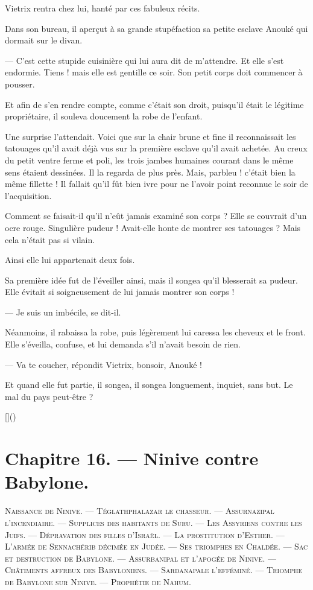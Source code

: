 \documentclass[a4paper, 11pt, oneside, polutonikogreek, french]{article}
\begin{document}
\bigskip
\centerline{\EightStarTaper}
\centerline{\EightStarTaper\EightStarTaper}
\bigskip

Vietrix rentra chez lui, hanté par ces fabuleux récits.

Dans son bureau, il aperçut à sa grande stupéfaction sa petite esclave Anouké qui dormait sur le divan.

--- C'est cette stupide cuisinière qui lui aura dit de m'attendre. Et elle s'est endormie. Tiens ! mais elle est gentille ce soir. Son petit corps doit commencer à pousser.

Et afin de s'en rendre compte, comme c'était son droit, puisqu'il était le légitime propriétaire, il souleva doucement la robe de l'enfant.

Une surprise l'attendait. Voici que sur la chair brune et fine il reconnaissait les tatouages qu'il avait déjà vus sur la première esclave qu'il avait achetée. Au creux du petit ventre ferme et poli, les trois jambes humaines courant dans le même sens étaient dessinées. Il la regarda de plus près. Mais, parbleu ! c'était bien la même fillette ! Il fallait qu'il fût bien ivre pour ne l'avoir point reconnue le soir de l'acquisition.

Comment se faisait-il qu'il n'eût jamais examiné son corps ? Elle se couvrait d'un ocre rouge. Singulière pudeur ! Avait-elle honte de montrer ses tatouages ? Mais cela n'était pas si vilain.

Ainsi elle lui appartenait deux fois.

Sa première idée fut de l'éveiller ainsi, mais il songea qu'il blesserait sa pudeur. Elle évitait si soigneusement de lui jamais montrer son corps !

--- Je suis un imbécile, se dit-il.

Néanmoins, il rabaissa la robe, puis légèrement lui caressa les cheveux et le front. Elle s'éveilla, confuse, et lui demanda s'il n'avait besoin de rien.

--- Va te coucher, répondit Vietrix, bonsoir, Anouké !

Et quand elle fut partie, il songea, il songea longuement, inquiet, sans but. Le mal du pays peut-être ?

[]()
\clearpage
\section{Chapitre 16. --- Ninive contre Babylone.}
\begin{center}
\scshape
\small
Naissance de Ninive. --- Téglathphalazar le chasseur. --- Assurnazipal l'incendiaire. --- Supplices des habitants de Suru. --- Les Assyriens contre les Juifs. --- Dépravation des filles d'Israël. --- La prostitution d'Esther. --- L'armée de Sennachérib décimée en Judée. --- Ses triomphes en Chaldée. --- Sac et destruction de Babylone. --- Assurbanipal et l'apogée de Ninive. --- Châtiments affreux des Babyloniens. --- Sardanapale l'efféminé. --- Triomphe de Babylone sur Ninive. --- Prophétie de Nahum.
\end{center}
\end{document}
